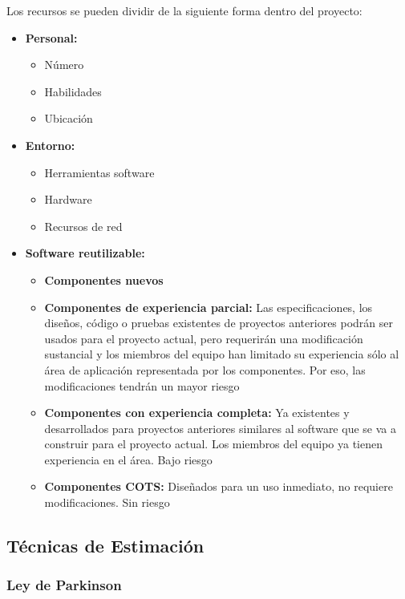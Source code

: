 Los recursos se pueden dividir de la siguiente forma dentro del proyecto:

\begin{itemize}
    \item \textbf{Personal:}
    \begin{itemize}
        \item Número
        \item Habilidades
        \item Ubicación
    \end{itemize}
    \item \textbf{Entorno:}
    \begin{itemize}
        \item Herramientas software
        \item Hardware
        \item Recursos de red
    \end{itemize}
    \item \textbf{Software reutilizable:}
    \begin{itemize}
        \item \textbf{Componentes nuevos}
        \item \textbf{Componentes de experiencia parcial:} Las especificaciones, los diseños, código o pruebas existentes de proyectos anteriores podrán ser usados para el proyecto actual, pero requerirán una modificación sustancial y los miembros del equipo han limitado su experiencia sólo al área de aplicación representada por los componentes.
        Por eso, las modificaciones tendrán un mayor riesgo
        \item \textbf{Componentes con experiencia completa:} Ya existentes y desarrollados para proyectos anteriores similares al software que se va a construir para el proyecto actual.
        Los miembros del equipo ya tienen experiencia en el área.
        Bajo riesgo
        \item \textbf{Componentes COTS:} Diseñados para un uso inmediato, no requiere modificaciones.
        Sin riesgo
    \end{itemize}
\end{itemize}

\subsection{Técnicas de Estimación}\label{subsec:tecnicas-de-estimacion}

\subsubsection{Ley de Parkinson}

